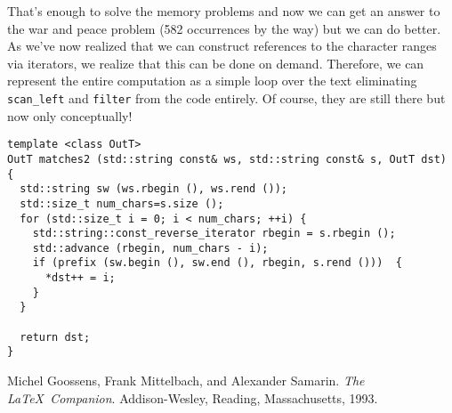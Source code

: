 \documentclass{article}
\begin{document}
That's enough to solve the memory problems and now we can get an
answer to the war and peace problem (582 occurrences by the way) but
we can do better. As we've now realized that we can construct
references to the character ranges via iterators, we realize that this
can be done on demand. Therefore, we can represent the entire
computation as a simple loop over the text eliminating
\verb|scan_left| and \verb|filter| from the code entirely. Of course,
they are still there but now only conceptually!
\begin{verbatim}
template <class OutT>
OutT matches2 (std::string const& ws, std::string const& s, OutT dst) {
  std::string sw (ws.rbegin (), ws.rend ());
  std::size_t num_chars=s.size ();
  for (std::size_t i = 0; i < num_chars; ++i) {
    std::string::const_reverse_iterator rbegin = s.rbegin ();
    std::advance (rbegin, num_chars - i);
    if (prefix (sw.begin (), sw.end (), rbegin, s.rend ()))  {
      *dst++ = i;
    }
  }

  return dst;
}
\end{verbatim}

\begin{thebibliography}{9}
Michel Goossens, Frank Mittelbach, and Alexander Samarin. 
\textit{The \LaTeX\ Companion}. 
Addison-Wesley, Reading, Massachusetts, 1993.
\end{thebibliography}
\end{document}

